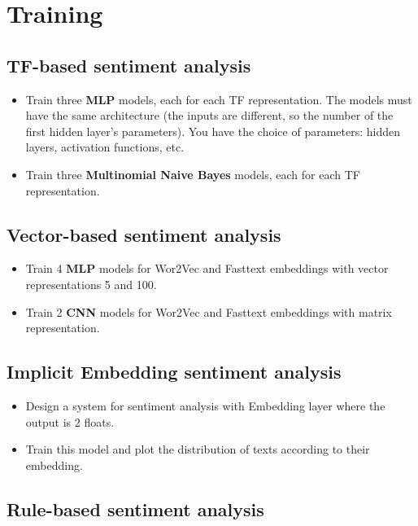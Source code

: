 \documentclass{../extra/aakpract/aakpract}
\begin{document}
\section{Training}

\subsection{TF-based sentiment analysis}

\begin{itemize}
	\item Train three \textbf{MLP} models, each for each TF representation. 
	The models must have the same architecture (the inputs are different, so the number of the first hidden layer's parameters).
	You have the choice of parameters: hidden layers, activation functions, etc.
	\item Train three \textbf{Multinomial Naive Bayes} models, each for each TF representation.
\end{itemize}

\subsection{Vector-based sentiment analysis}

\begin{itemize}
	\item Train 4 \textbf{MLP} models for Wor2Vec and Fasttext embeddings with vector representations 5 and 100. 
	\item Train 2 \textbf{CNN} models for Wor2Vec and Fasttext embeddings with matrix representation.
\end{itemize}

\subsection{Implicit Embedding sentiment analysis}

\begin{itemize}
	\item Design a system for sentiment analysis with Embedding layer where the output is 2 floats. 
	\item Train this model and plot the distribution of texts according to their embedding.
\end{itemize}

\subsection{Rule-based sentiment analysis}
\end{document}
